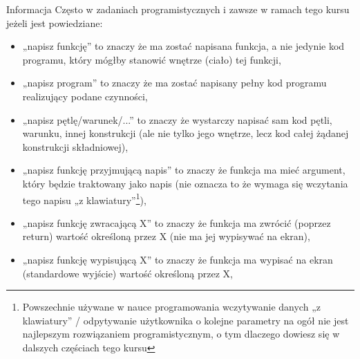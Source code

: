 % 
% 
% 
% 

\begin{ProTip}{Informacja}
Często w zadaniach programistycznych i zawsze w ramach tego kursu jeżeli jest powiedziane:
\begin{itemize}
\item „napisz funkcję” to znaczy że ma zostać napisana funkcja, a nie jedynie kod programu, który mógłby stanowić wnętrze (ciało) tej funkcji,
\item „napisz program” to znaczy że ma zostać napisany pełny kod programu realizujący podane czynności,
\item „napisz pętlę/warunek/...” to znaczy że wystarczy napisać sam kod pętli, warunku, innej konstrukcji (ale nie tylko jego wnętrze, lecz kod całej żądanej konstrukcji składniowej),

\item „napisz funkcję przyjmującą napis” to znaczy że funkcja ma mieć argument, który będzie traktowany jako napis
	(nie oznacza to że wymaga się wczytania tego napisu „z klawiatury”\footnote{
		Powszechnie używane w nauce programowania wczytywanie danych „z klawiatury” / odpytywanie użytkownika o kolejne parametry na ogół nie jest najlepszym rozwiązaniem programistycznym,
		o tym dlaczego dowiesz się w dalszych częściach tego kursu
	}),
\item „napisz funkcję zwracającą X” to znaczy że funkcja ma zwrócić (poprzez return) wartość określoną przez X (nie ma jej wypisywać na ekran),
\item „napisz funkcję wypisującą X” to znaczy że funkcja ma wypisać na ekran (standardowe wyjście) wartość określoną przez X,
\end{itemize}
\end{ProTip}
